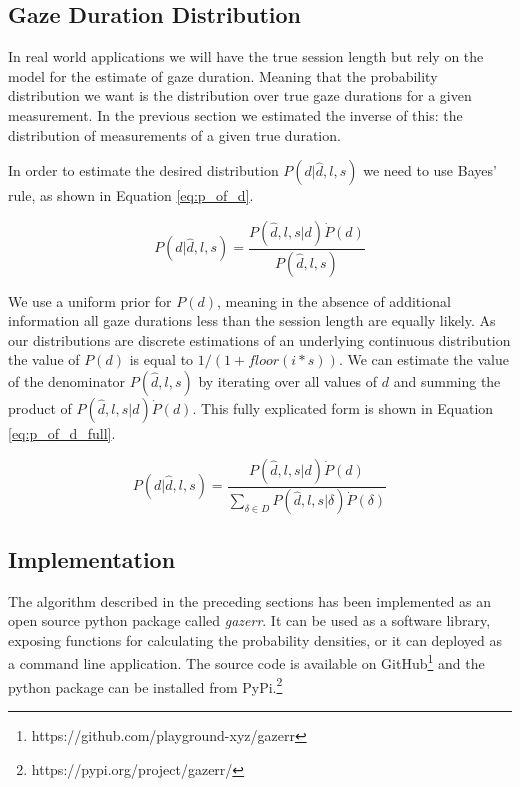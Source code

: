 \documentclass[12pt,a4paper]{article}
\numberwithin{equation}{section}
\begin{document}
\subsection{Gaze Duration Distribution}

In real world applications we will have the true session length but rely on the model for the 
estimate of gaze duration. Meaning that the probability distribution we want is the distribution 
over true gaze durations for a given measurement. In the previous section we estimated the inverse of
this: the distribution of measurements of a given true duration. 

In order to estimate the desired distribution $P(d|\hat{d},l,s)$ we need to use 
Bayes' rule, as shown in Equation \ref{eq:p_of_d}.

\begin{equation}
\label{eq:p_of_d}
P(d|\hat{d},l,s) =  \frac{ P(\hat{d},l,s|d) \dot P(d) }{ P(\hat{d},l,s)  }
\end{equation}

We use a uniform prior for $P(d)$, meaning in the absence of additional information all
gaze durations less than the session length are equally likely. As our distributions are
discrete estimations of an underlying continuous distribution the value of $P(d)$ is
equal to $1/(1+floor(i*s))$. We can estimate the value
of the denominator $P(\hat{d},l,s)$ by iterating over all values of $d$ and summing the product
of $ P(\hat{d},l,s|d) \dot P(d)$. This fully explicated form is shown in 
Equation \ref{eq:p_of_d_full}.

\begin{equation}
\label{eq:p_of_d_full}
P(d|\hat{d},l,s) =  \frac{ P(\hat{d},l,s|d) \dot P(d) }{ \sum_{\delta \in D} P(\hat{d},l,s|\delta) \dot P(\delta)  }
\end{equation}

\subsection{Implementation}

The algorithm described in the preceding sections has been implemented as an open source python 
package called \textit{gazerr}. 
It can be used as a software library, exposing functions for calculating the probability densities,
or it can deployed as a command line application. 
The source code is available on GitHub\footnote{https://github.com/playground-xyz/gazerr}
and the python package can be installed from PyPi.\footnote{https://pypi.org/project/gazerr/}
\end{document}
